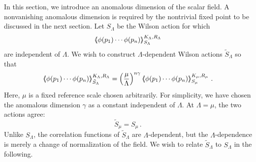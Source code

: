 \documentclass[aps,prd,preprint,groupedaddress,preprintnumbers,longbibliography]{revtex4-1}
\newcommand{\SL}{S_\Lambda}
\newcommand{\vev}[1]{\left\langle #1 \right\rangle}
\newcommand{\vvev}[1]{\vev{\kern-0.3em\left\langle #1
    \right\rangle\kern-0.3em}}
\begin{document}
In this section, we introduce an anomalous dimension of the scalar
field.  A nonvanishing anomalous dimension is required by the
nontrivial fixed point to be discussed in the next section.  Let $\SL$
be the Wilson action for which
\begin{equation}
\vvev{\phi (p_1) \cdots \phi (p_n)}_{\SL}^{K_\Lambda, R_\Lambda}
\end{equation}
are independent of $\Lambda$.  We wish to construct
$\Lambda$-dependent Wilson actions $\tilde{S}_\Lambda$ so that
\begin{equation}
\vvev{\phi (p_1) \cdots \phi (p_n)}_{\tilde{S}_\Lambda}^{K_\Lambda,
  R_\Lambda}
= \left(\frac{\mu}{\Lambda}\right)^{n \gamma} \vvev{\phi (p_1) \cdots
  \phi (p_n)}_{S_\mu}^{K_\mu,  R_\mu}\,.
\label{StildeL-SL}
\end{equation}
Here, $\mu$ is a fixed reference scale chosen arbitrarily.  For
simplicity, we have chosen the anomalous dimension $\gamma$ as a
constant independent of $\Lambda$.  At $\Lambda = \mu$, 
the two actions agree:
\begin{equation}
\tilde{S}_\mu = S_\mu\,.
\end{equation}
Unlike $\SL$, the correlation functions of $\tilde{S}_\Lambda$ are
$\Lambda$-dependent, but the $\Lambda$-dependence is merely a change
of normalization of the field.  We wish to relate $\tilde{S}_\Lambda$
to $\SL$ in the following.
\end{document}
